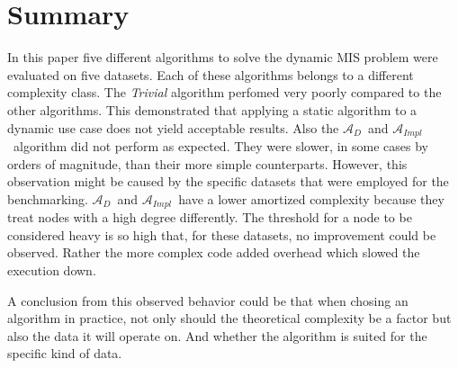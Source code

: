 \documentclass[letterpaper,11pt]{article}
\newcommand{\dynamic}{$\mathcal{A}_{D}$\ }
\newcommand{\implicit}{$\mathcal{A}_{Impl}$\ }
\begin{document}
\section{Summary}
\label{Summary}

In this paper five different algorithms to solve the dynamic MIS problem
were evaluated on five datasets. Each of these algorithms belongs to a different
complexity class.
The \textit{Trivial} algorithm perfomed very poorly compared to the other algorithms.
This demonstrated that applying a static algorithm to a dynamic use case
does not yield acceptable results.
Also the \dynamic and \implicit algorithm did not perform as expected. They were
slower, in some cases by orders of magnitude, than their more simple counterparts.
However, this observation might be caused by the specific datasets that were employed
for the benchmarking. \dynamic and \implicit have a lower amortized complexity because
they treat nodes with a high degree differently. The threshold for a node to be
considered heavy is so high that, for these datasets, no improvement could
be observed. Rather the more complex code added overhead which slowed the execution
down.

A conclusion from this observed behavior could be that when chosing an algorithm in practice,
not only should the theoretical complexity be a factor but also the data it will
operate on. And whether the algorithm is suited for the specific kind of data.



{}

\end{document}

